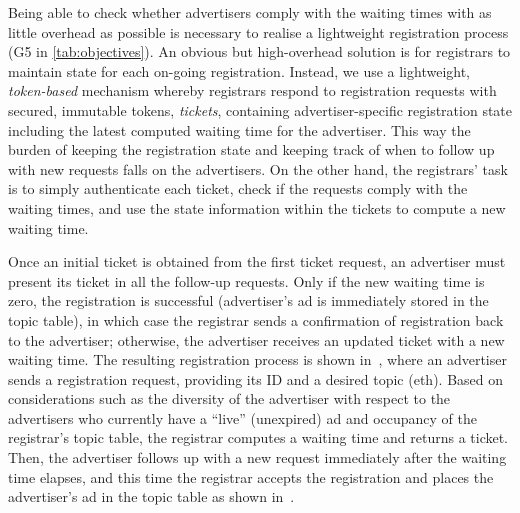 Being able to check whether advertisers comply with the waiting times with as little overhead as possible is necessary to realise a lightweight registration process (G5 in \cref{tab:objectives}).  An obvious but high-overhead solution is for registrars to maintain state for each on-going registration. %
Instead, we use a lightweight, \textit{token-based} mechanism whereby registrars respond to registration requests with secured, immutable tokens, \ie \textit{tickets}, containing advertiser-specific registration state including the latest computed waiting time for the advertiser. This way the burden of keeping the registration state and keeping track of when to follow up with new requests falls on the advertisers. On the other hand, the registrars' task is to simply authenticate each ticket, check if the requests comply with the waiting times, and use the state information within the tickets to compute a new waiting time.  



Once an initial ticket is obtained from the first ticket request, an advertiser must present its ticket in all the follow-up requests. Only if the new waiting time is zero, the registration is successful (\ie advertiser's ad is immediately stored in the topic table), in which case the registrar sends a confirmation of registration back to the advertiser; otherwise, the advertiser receives an updated ticket with a new waiting time. The resulting registration process is shown in~, where an advertiser sends a registration request, providing its ID and a desired topic (eth). Based on considerations such as the diversity of the advertiser with respect to the advertisers who currently have a ``live'' (\ie unexpired) ad and occupancy of the registrar's topic table, the registrar computes a waiting time and returns a ticket. Then, the advertiser follows up with a new request immediately after the waiting time elapses, and this time the registrar accepts the registration and places the advertiser's ad in the topic table as shown in~.

